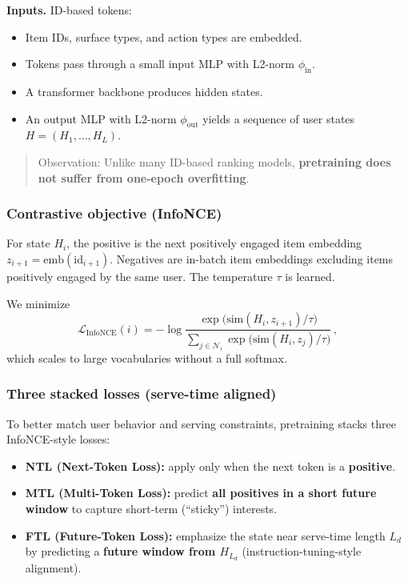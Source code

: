 \documentclass[
  letterpaper,
  DIV=11,
  numbers=noendperiod]{scrartcl}
\providecommand{\tightlist}{%
  \setlength{\itemsep}{0pt}\setlength{\parskip}{0pt}}
\begin{document}
\textbf{Inputs.} ID-based tokens:

\begin{itemize}
\tightlist
\item
  Item IDs, surface types, and action types are embedded.
\item
  Tokens pass through a small input MLP with L2-norm
  \(\phi_{\text{in}}\).
\item
  A transformer backbone produces hidden states.
\item
  An output MLP with L2-norm \(\phi_{\text{out}}\) yields a sequence of
  user states \(H = (H_1,\dots,H_L)\).
\end{itemize}

\begin{quote}
Observation: Unlike many ID-based ranking models, \textbf{pretraining
does not suffer from one-epoch overfitting}.
\end{quote}

\subsubsection{Contrastive objective
(InfoNCE)}\label{contrastive-objective-infonce}

For state \(H_i\), the positive is the next positively engaged item
embedding \(z_{i+1} = \mathrm{emb}(\mathrm{id}_{i+1})\). Negatives are
in-batch item embeddings excluding items positively engaged by the same
user. The temperature \(\tau\) is learned.

We minimize \[
\mathcal{L}_{\text{InfoNCE}}(i)
= - \log
\frac{\exp\!\big(\mathrm{sim}(H_i, z_{i+1})/\tau\big)}
{\sum\limits_{j \in \mathcal{N}_i}\exp\!\big(\mathrm{sim}(H_i, z_j)/\tau\big)} \, ,
\] which scales to large vocabularies without a full softmax.

\subsubsection{Three stacked losses (serve-time
aligned)}\label{three-stacked-losses-serve-time-aligned}

To better match user behavior and serving constraints, pretraining
stacks three InfoNCE-style losses:

\begin{itemize}
\tightlist
\item
  \textbf{NTL (Next-Token Loss):} apply only when the next token is a
  \textbf{positive}.
\item
  \textbf{MTL (Multi-Token Loss):} predict \textbf{all positives in a
  short future window} to capture short-term (``sticky'') interests.
\item
  \textbf{FTL (Future-Token Loss):} emphasize the state near serve-time
  length \(L_d\) by predicting a \textbf{future window from \(H_{L_d}\)}
  (instruction-tuning-style alignment).
\end{itemize}
\end{document}
